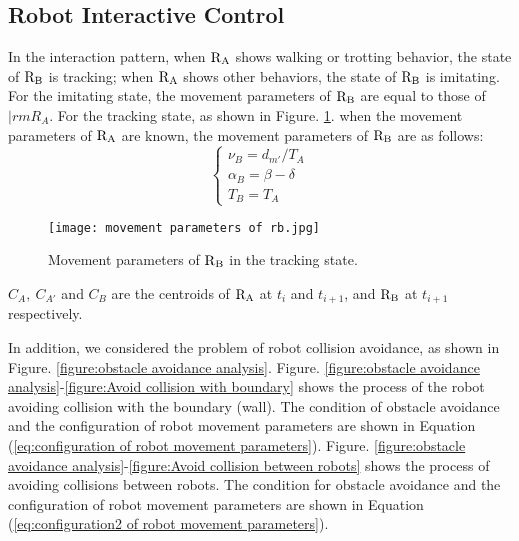 \subsection{Robot Interactive Control}
In the interaction pattern, when $\rm R_A$ shows walking or trotting behavior, the state of $\rm R_B$ is tracking; when $\rm R_A$ shows other behaviors, the state of $\rm R_B$ is imitating. For the imitating state, the movement parameters of $\rm R_B$ are equal to those of $|rm R_A$. For the tracking state, as shown in Figure. \ref{figure:movement parameters of RB in the tracking state}. when the movement parameters of $\rm R_A$ are known, the movement parameters of $\rm R_B$ are as follows:
\begin{equation} \label{eq:movement parameters}
    \begin{cases}
        \nu_B=d_{m'}/T_A \\
        \alpha_B=\beta - \delta \\
        T_B=T_A
    \end{cases}
\end{equation}
\begin{figure}[h]
    \centering
    \texttt{[image: movement parameters of rb.jpg]}
    \caption{Movement parameters of $\rm R_B$ in the tracking state.}
    \label{figure:movement parameters of RB in the tracking state}
\end{figure}
$C_A,~C_{A'}$ and $C_B$ are the centroids of $\rm R_A$ at $t_i$ and $t_{i+1}$, and $\rm R_B$ at $t_{i+1}$ respectively.

In addition, we considered the problem of robot collision avoidance, as shown in Figure. \ref{figure:obstacle avoidance analysis}. Figure. \ref{figure:obstacle avoidance analysis}-\ref{figure:Avoid collision with boundary} shows the process of the robot avoiding collision with the boundary (wall). The condition of obstacle avoidance and the configuration of robot movement parameters are shown in Equation (\ref{eq:configuration of robot movement parameters}). Figure. \ref{figure:obstacle avoidance analysis}-\ref{figure:Avoid collision between robots} shows the process of avoiding collisions between robots. The condition for obstacle avoidance and the configuration of robot movement parameters are shown in Equation (\ref{eq:configuration2 of robot movement parameters}).


